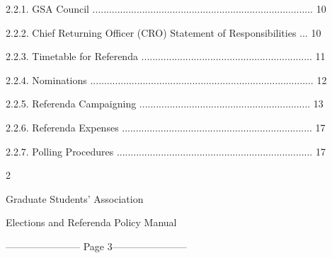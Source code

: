    2.2.1.          GSA Council ................................................................................ 10  



   2.2.2.          Chief Returning Officer (CRO) Statement of Responsibilities ... 10  



   2.2.3.          Timetable for Referenda .............................................................. 11  



   2.2.4.         Nominations ................................................................................. 12  



   2.2.5.          Referenda Campaigning .............................................................. 13  



   2.2.6.          Referenda Expenses ..................................................................... 17  



   2.2.7.          Polling Procedures ....................................................................... 17  

  

  

  

  

  

  

  

  

  

  

  

  

  

  

  



                                                                   2  

                                                                                                                                        

                                       Graduate Students’ Association  

                                Elections and Referenda Policy Manual  

  


----------------------- Page 3-----------------------

